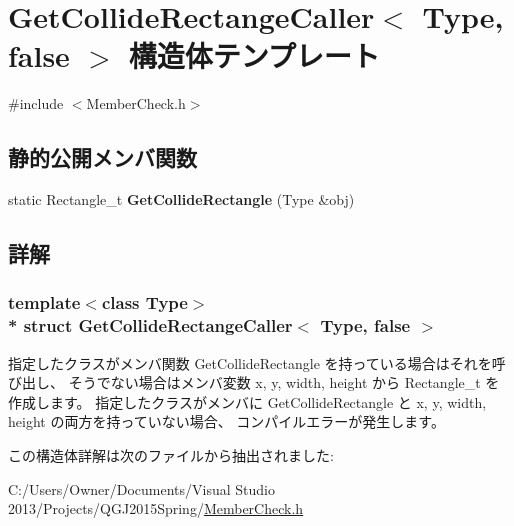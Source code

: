 \hypertarget{struct_get_collide_rectange_caller_3_01_type_00_01false_01_4}{}\section{Get\+Collide\+Rectange\+Caller$<$ Type, false $>$ 構造体テンプレート}
\label{struct_get_collide_rectange_caller_3_01_type_00_01false_01_4}


 




{\ttfamily \#include $<$Member\+Check.\+h$>$}

\subsection*{静的公開メンバ関数}
\begin{DoxyCompactItemize}
\item 
static Rectangle\+\_\+t {\bfseries Get\+Collide\+Rectangle} (Type \&obj)\hypertarget{struct_get_collide_rectange_caller_3_01_type_00_01false_01_4_acb5505fa743a3c7564ac4a8723582e1c}{}\label{struct_get_collide_rectange_caller_3_01_type_00_01false_01_4_acb5505fa743a3c7564ac4a8723582e1c}

\end{DoxyCompactItemize}


\subsection{詳解}
\subsubsection*{template$<$class Type$>$\\*
struct Get\+Collide\+Rectange\+Caller$<$ Type, false $>$}



指定したクラスがメンバ関数 Get\+Collide\+Rectangle を持っている場合はそれを呼び出し、 そうでない場合はメンバ変数 x, y, width, height から Rectangle\+\_\+t を作成します。 指定したクラスがメンバに Get\+Collide\+Rectangle と x, y, width, height の両方を持っていない場合、 コンパイルエラーが発生します。 

この構造体詳解は次のファイルから抽出されました\+:\begin{DoxyCompactItemize}
\item 
C\+:/\+Users/\+Owner/\+Documents/\+Visual Studio 2013/\+Projects/\+Q\+G\+J2015\+Spring/\hyperlink{_member_check_8h}{Member\+Check.\+h}\end{DoxyCompactItemize}
